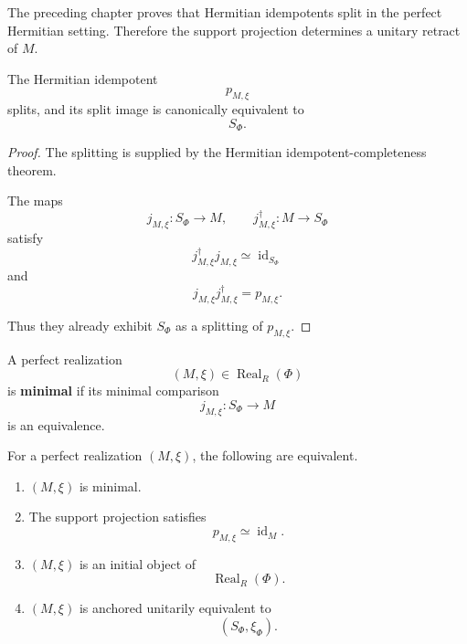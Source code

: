 The preceding chapter proves that Hermitian idempotents split in the perfect
Hermitian setting. Therefore the support projection determines a unitary
retract of \(M\).

\begin{proposition}
\label{prop:higher-minimal-as-hermitian-retract}
The Hermitian idempotent
\[
  p_{M,\xi}
\]
splits, and its split image is canonically equivalent to
\[
  S_\Phi.
\]
\end{proposition}

\begin{proof}
The splitting is supplied by the Hermitian idempotent-completeness theorem.

The maps
\[
  j_{M,\xi}:S_\Phi\to M,
  \qquad
  j_{M,\xi}^\dagger:M\to S_\Phi
\]
satisfy
\[
  j_{M,\xi}^\dagger j_{M,\xi}
  \simeq
  \operatorname{id}_{S_\Phi}
\]
and
\[
  j_{M,\xi}j_{M,\xi}^\dagger
  =
  p_{M,\xi}.
\]

Thus they already exhibit \(S_\Phi\) as a splitting of \(p_{M,\xi}\).
\end{proof}

\begin{definition}
\label{def:higher-minimal-realization}
A perfect realization
\[
  (M,\xi)
  \in
  \operatorname{Real}_R(\Phi)
\]
is \textbf{minimal} if its minimal comparison
\[
  j_{M,\xi}:S_\Phi\to M
\]
is an equivalence.
\end{definition}

\begin{proposition}
\label{prop:higher-equivalent-minimality-criteria}
For a perfect realization \((M,\xi)\), the following are equivalent.

\begin{enumerate}
  \item \((M,\xi)\) is minimal.

  \item The support projection satisfies
  \[
    p_{M,\xi}
    \simeq
    \operatorname{id}_M.
  \]

  \item \((M,\xi)\) is an initial object of
  \[
    \operatorname{Real}_R(\Phi).
  \]

  \item \((M,\xi)\) is anchored unitarily equivalent to
  \[
    (S_\Phi,\xi_\Phi).
  \]
\end{enumerate}
\end{proposition}

